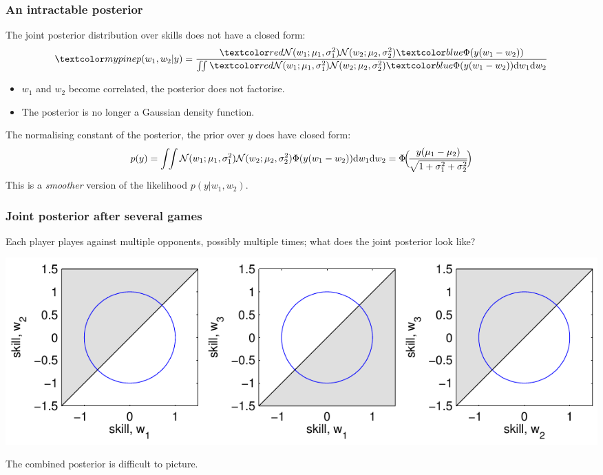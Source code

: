 \begin{frame}
\frametitle{An intractable posterior}

The joint posterior distribution over skills does not have a closed form:
\[
\Green{p(w_1,w_2|y)} = \frac{\Red{\N(w_1; \mu_1, \sigma_1^2)\N(w_2; \mu_2, \sigma_2^2)}
\Blue{\Phi(y(w_1-w_2))}}
{\int\!\!\int \Red{\N(w_1; \mu_1, \sigma_1^2)\N(w_2; \mu_2, \sigma_2^2)}
\Blue{\Phi(y(w_1-w_2))}\mathrm{d}w_1\mathrm{d}w_2}
\]

\begin{itemize}
\item $w_1$ and $w_2$ become correlated, the posterior does not factorise.
\item The posterior is no longer a Gaussian density function.
\end{itemize}
The normalising constant of the posterior, the prior over $y$ does have closed form:
\[
p(y) = \int\!\!\int \mathcal{N}(w_1; \mu_1, \sigma_1^2)\mathcal{N}(w_2; \mu_2, \sigma_2^2)
\Phi(y(w_1-w_2))\mathrm{d}w_1\mathrm{d}w_2 = 
\Phi\!\Big(\!\frac{y(\mu_1-\mu_2)}{\sqrt{1+\sigma_1^2+\sigma_2^2}}\!\Big)
\]
This is a \emph{smoother} version of the likelihood $p(y|w_1,w_2)$.\\
\hfill{}
\end{frame}


\begin{frame}
\frametitle{Joint posterior after several games}

Each player playes against multiple opponents, possibly multiple
times; what does the joint posterior look like?

\centerline{\includegraphics[width=\textwidth]{jp}}

The combined posterior is difficult to picture.

\hfill{}

\hfill{}
\end{frame}

